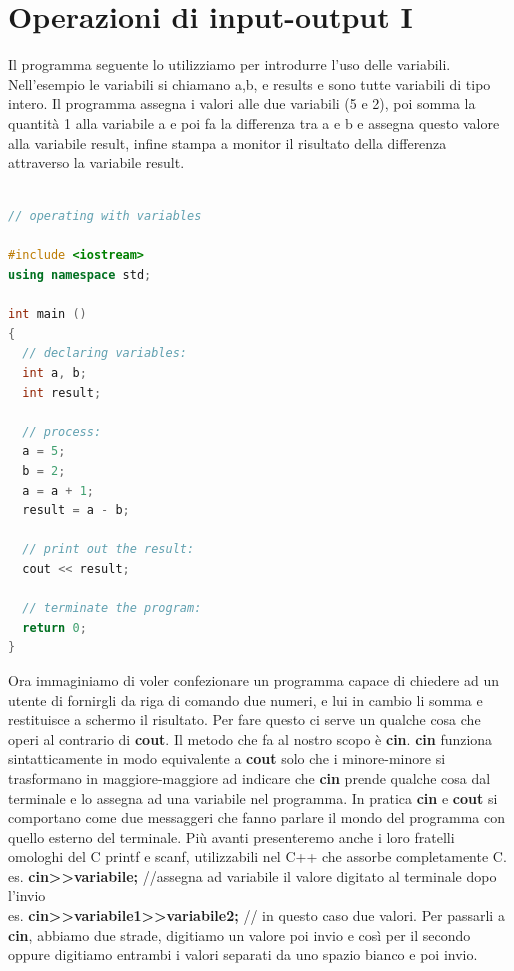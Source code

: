 \documentclass[11pt,fleqn]{book} %
\begin{document}
\section{Operazioni di input-output I}

Il programma seguente lo utilizziamo per introdurre l'uso delle variabili. Nell'esempio le variabili si chiamano a,b, e results e sono tutte variabili di tipo intero. Il programma assegna i valori alle due variabili (5 e 2), poi somma la quantità 1 alla variabile a e poi fa la differenza tra a e b e assegna questo valore alla variabile result, infine stampa a monitor il risultato della differenza attraverso la variabile result.
\begin{lstlisting}[language=c++]

// operating with variables

#include <iostream>
using namespace std;

int main ()
{
  // declaring variables:
  int a, b;
  int result;

  // process:
  a = 5;
  b = 2;
  a = a + 1;
  result = a - b;

  // print out the result:
  cout << result;

  // terminate the program:
  return 0;
}
\end{lstlisting}


Ora immaginiamo di voler confezionare un programma capace di chiedere ad un utente di fornirgli da riga di comando due numeri, e lui in cambio li somma e restituisce a schermo il risultato. Per fare questo ci serve un qualche cosa che operi al contrario di \textbf{cout}. Il metodo che fa al nostro scopo è \textbf{cin}. \textbf{cin} funziona sintatticamente in modo equivalente a \textbf{cout} solo che i minore-minore si trasformano in maggiore-maggiore ad indicare che \textbf{cin} prende qualche cosa dal terminale e lo assegna ad una variabile nel programma.
In pratica \textbf{cin} e \textbf{cout} si comportano come due messaggeri che fanno parlare il mondo del programma con quello esterno del terminale.
Più avanti presenteremo anche i loro fratelli omologhi del C printf e scanf, utilizzabili nel C++ che assorbe completamente C.\\
es. \textbf{cin>>variabile;} //assegna ad variabile il valore digitato al terminale dopo l'invio\\
es. \textbf{cin>>variabile1>>variabile2; }// in questo caso due valori. Per passarli a \textbf{cin}, abbiamo due strade, digitiamo un valore poi invio e così per il secondo oppure digitiamo entrambi i valori separati da uno spazio bianco e poi invio.
\end{document}
